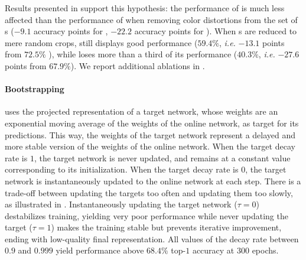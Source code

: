 Results presented in  support this hypothesis: the performance of \algo is much less affected than the performance of \simclr when removing color distortions from the set of \imageaugmentation s ($-9.1$ accuracy points for \algo, $-22.2$ accuracy points for \simclr). 
When \imageaugmentation s are reduced to mere random crops, \algo still displays good performance ($59.4\%$, \emph{i.e.} $-13.1$ points from $72.5\%$ ), while \simclr loses more than a third of its performance ($40.3\%$, \emph{i.e.}  $-27.6$ points from $67.9\%$). We report additional ablations in .

\paragraph{Bootstrapping}

\algo uses the projected representation of a target network, whose weights are an exponential moving average of the weights of the online network, as target for its predictions. This way, the weights of the target network represent a delayed and more stable version of the weights of the online network. When the target decay rate is $1$, the target network is never updated, and remains at a constant value corresponding to its initialization. When the target decay rate is $0$, the target network is instantaneously updated to the online network at each step. 
There is a trade-off between updating the targets too often and updating them too slowly, as illustrated in . 
Instantaneously updating the target network ($\tau = 0$) destabilizes training, yielding very poor performance while never updating the target ($\tau = 1$) makes the training stable but prevents iterative improvement, ending with low-quality final representation. All values of the decay rate between $0.9$ and $0.999$ yield performance above $68.4\%$ top-$1$ accuracy at $300$ epochs. 

